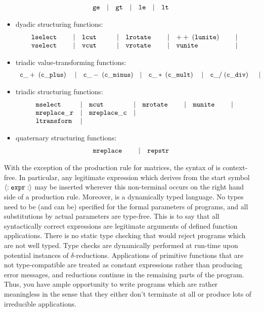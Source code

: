 \begin{itemize}
$$\begin{array}{lclclclc}
{\tt ge} &|& {\tt gt}&|& {\tt le} &|& {\tt lt} &\\
\end{array}
$$
\item {\mys dyadic structuring functions}:
$$
\begin{array}{lclclclc}
{\tt lselect}\;\;\;\;\; &|& {\tt lcut}\;\;\;\;\;\;\; &|& {\tt lrotate}\;\;\;\;\; &|& {\tt ++\;(lunite)}\;\;\;\;\; &|\\
{\tt vselect} &|& {\tt vcut} &|& {\tt vrotate} &|& {\tt vunite} &|\\
\end{array}
$$
\item {\mys triadic value-transforming functions}:
$$
\begin{array}{lclclclc}
{\tt c\_+\;(c\_plus)}\; &|& {\tt c\_-\;(c\_minus)} &|& {\tt c\_*\;(c\_mult)}\; &|& {\tt c\_/\;(c\_div)}\;\; &|\\
\end{array}
$$
\item {\mys triadic structuring functions}:
$$
\begin{array}{lclclclc}
{\tt mselect}\;\;\;\;\; &|& {\tt mcut}\;\;\;\;\;\;\; &|& {\tt mrotate}\;\;\;\;\; &|& {\tt munite}\;\;\;\;\; &|\\
{\tt mreplace\_r} &|& {\tt mreplace\_c} &|\\
{\tt ltransform} &|&\\ 
\end{array}
$$
\item {\mys quaternary structuring functions}:
$$
\begin{array}{lclc}
{\tt mreplace}\;\;\;\;\; &|& {\tt repstr} &
\end{array}
$$
\end{itemize}
With the exception of the production rule for matrices, the syntax
 of \kir is context-free. In
particular, any legitimate \kir expression which derives from the start symbol ${\tt \langle:expr:\rangle}$ may be inserted wherever
 this non-terminal occurs on the right hand side of a production rule.
Moreover, \kir is a dynamically typed language. 
No types need to be (and can be) 
specified for the formal parameters of \kir programs, and
 all substitutions by actual parameters are type-free. This is to say that all syntactically correct \kir expressions are legitimate
arguments of defined function applications. 
There is no static type checking that
would reject programs which are not well typed. Type checks are dynamically
performed at run-time upon potential
 instances of $\delta$-reductions. Applications of primitive
 functions that are not type-compatible are treated as constant
 expressions rather than producing error messages, and reductions
 continue in the remaining parts of the program.
Thus, you have ample opportunity to write programs which are rather
meaningless in the sense that they either don't terminate at all or
produce lots of irreducible applications.

